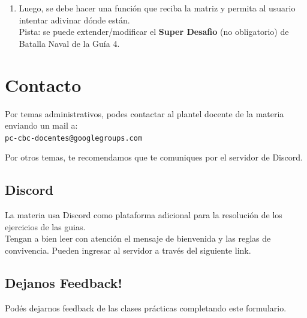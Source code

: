 \documentclass[
  letterpaper,
  DIV=11,
  numbers=noendperiod]{scrreprt}
\providecommand{\tightlist}{%
  \setlength{\itemsep}{0pt}\setlength{\parskip}{0pt}}\usepackage{longtable,booktabs,array}
\begin{document}
\begin{enumerate}
  \begin{enumerate}
  \def\labelenumii{\alph{enumii}.}
  \setcounter{enumii}{1}
  \tightlist
  \item
    Luego, se debe hacer una función que reciba la matriz y permita al
    usuario intentar adivinar dónde están.\\
    Pista: se puede extender/modificar el \textbf{Super Desafio} (no
    obligatorio) de Batalla Naval de la Guía 4.
  \end{enumerate}
\end{enumerate}


\chapter*{Contacto}\label{contacto}


Por temas administrativos, podes contactar al plantel docente de la
materia enviando un mail a:\\
\texttt{pc-cbc-docentes@googlegroups.com}

Por otros temas, te recomendamos que te comuniques por el servidor de
Discord.

\section*{Discord}\label{discord-1}


La materia usa Discord como plataforma adicional para la resolución de
los ejercicios de las guias.\\
Tengan a bien leer con atención el mensaje de bienvenida y las reglas de
convivencia. Pueden ingresar al servidor a través del siguiente link.

\section*{Dejanos Feedback!}\label{dejanos-feedback}


Podés dejarnos feedback de las clases prácticas completando este
formulario.
\end{document}
